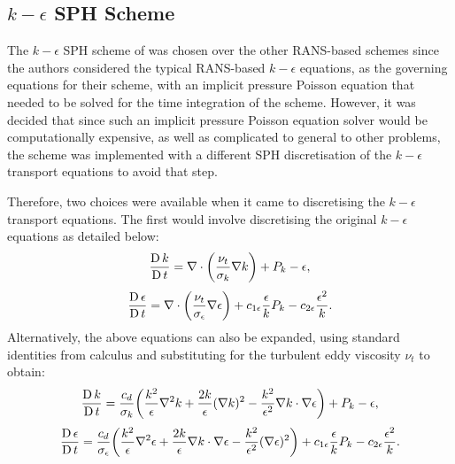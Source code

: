 \subsection[k-epsilon SPH Scheme]{$k-\epsilon$ SPH Scheme}
The $k-\epsilon$ SPH scheme of \cite{Shao2006} was chosen over the other RANS-based schemes since the authors considered the typical RANS-based $k-\epsilon$ equations, as the governing equations for their scheme, with an implicit pressure Poisson equation that needed to be solved for the time integration of the scheme.
However, it was decided that since such an implicit pressure Poisson equation solver would be computationally expensive, as well as complicated to general to other problems, the scheme was implemented with a different SPH discretisation of the $k-\epsilon$ transport equations to avoid that step.

Therefore, two choices were available when it came to discretising the $k-\epsilon$ transport equations.
The first would involve discretising the original $k-\epsilon$ equations as detailed below:
\begin{equation}
  \frac{\operatorname{D} k}{\operatorname{D} t} = \nabla \cdot \bigg( \frac{\nu_t}{\sigma_k} \nabla k \bigg) + P_k - \epsilon,
  \label{eq:Shao2006-k-transport-eq-res-chap}
\end{equation}
\begin{equation}
  \frac{\operatorname{D} \epsilon}{\operatorname{D} t} = \nabla \cdot \bigg( \frac{\nu_t}{\sigma_{\epsilon}} \nabla \epsilon \bigg) + c_{1\epsilon} \frac{\epsilon}{k} P_k - c_{2\epsilon} \frac{\epsilon^2}{k}.
  \label{eq:Shao2006-eps-transport-eq-res-chap}
\end{equation}
Alternatively, the above equations can also be expanded, using standard identities from calculus and substituting for the turbulent eddy viscosity $\nu_t$ to obtain:
\begin{equation}
  \frac{\operatorname{D} k}{\operatorname{D} t} = \frac{c_d}{\sigma_k} \bigg( \frac{k^2}{\epsilon} \nabla^2 k + \frac{2k}{\epsilon} (\nabla k)^2 - \frac{k^2}{\epsilon^2} \nabla k \cdot \nabla \epsilon \bigg) + P_k - \epsilon,
  \label{eq:Shao2006-k-transport-eq-exp-res-chap}
\end{equation}
\begin{equation}
  \frac{\operatorname{D} \epsilon}{\operatorname{D} t} = \frac{c_d}{\sigma_\epsilon} \bigg( \frac{k^2}{\epsilon} \nabla^2 \epsilon + \frac{2k}{\epsilon} \nabla k \cdot \nabla \epsilon - \frac{k^2}{\epsilon^2} (\nabla \epsilon)^2 \bigg) + c_{1\epsilon} \frac{\epsilon}{k} P_k - c_{2\epsilon} \frac{\epsilon^2}{k}.
  \label{eq:Shao2006-eps-transport-eq-exp-res-chap}
\end{equation}

